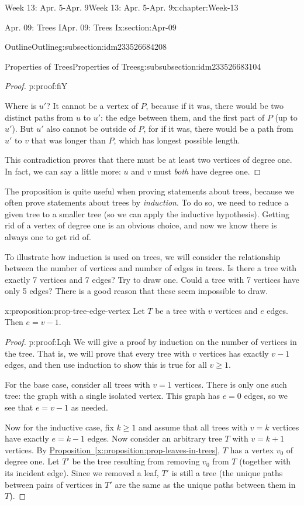 \documentclass[oneside,10pt,]{book}
\newcommand{\xreffont}{\relax}
\numberwithin{equation}{section}
\renewcommand{\ge}{\geqslant}
\begin{document}
\begin{chapterptx}{Week 13: Apr. 5-Apr. 9}{}{Week 13: Apr. 5-Apr. 9}{}{}{x:chapter:Week-13}
\begin{sectionptx}{Apr. 09: Trees I}{}{Apr. 09: Trees I}{}{}{x:section:Apr-09}
\begin{subsectionptx}{Outline}{}{Outline}{}{}{g:subsection:idm233526684208}
\begin{subsubsectionptx}{Properties of Trees}{}{Properties of Trees}{}{}{g:subsubsection:idm233526683104}
\begin{proof}{}{p:proof:fiY}
\par
Where is \(u'\)?  It cannot be a vertex of \(P\), because if it was, there would be two distinct paths from \(u\) to \(u'\): the edge between them, and the first part of \(P\) (up to \(u'\)).  But \(u'\) also cannot be outside of \(P\), for if it was, there would be a path from \(u'\) to \(v\) that was longer than \(P\), which has longest possible length.%
\par
This contradiction proves that there must be at least two vertices of degree one.  In fact, we can say a little more: \(u\) and \(v\) must \emph{both} have degree one.%
\end{proof}
The proposition is quite useful when proving statements about trees, because we often prove statements about trees by \emph{induction}.  To do so, we need to reduce a given tree to a smaller tree (so we can apply the inductive hypothesis).  Getting rid of a vertex of degree one is an obvious choice, and now we know there is always one to get rid of.%
\par
To illustrate how induction is used on trees, we will consider the relationship between the number of vertices and number of edges in trees.  Is there a tree with exactly 7 vertices and 7 edges?  Try to draw one.  Could a tree with 7 vertices have only 5 edges?  There is a good reason that these seem impossible to draw.%
\begin{proposition}{}{}{x:proposition:prop-tree-edge-vertex}%
%
Let \(T\) be a tree with \(v\) vertices and \(e\) edges.  Then \(e = v-1\).%
\end{proposition}
\begin{proof}{}{p:proof:Lqh}
We will give a proof by induction on the number of vertices in the tree.  That is, we will prove that every tree with \(v\) vertices has exactly \(v-1\) edges, and then use induction to show this is true for all \(v \ge 1\).%
\par
For the base case, consider all trees with \(v = 1\) vertices.  There is only one such tree: the graph with a single isolated vertex.  This graph has \(e = 0\) edges, so we see that \(e = v-1\) as needed.%
\par
Now for the inductive case, fix \(k \ge 1\) and assume that all trees with \(v=k\) vertices have exactly \(e=k-1\) edges.  Now consider an arbitrary tree \(T\) with \(v = k+1\) vertices.  By \hyperref[x:proposition:prop-leaves-in-trees]{Proposition~{\xreffont\ref{x:proposition:prop-leaves-in-trees}}}, \(T\) has a vertex \(v_0\) of degree one.  Let \(T'\) be the tree resulting from removing \(v_0\) from \(T\) (together with its incident edge).  Since we removed a leaf, \(T'\) is still a tree (the unique paths between pairs of vertices in \(T'\) are the same as the unique paths between them in \(T\)).%

\end{proof}
\end{subsubsectionptx}
\end{subsectionptx}
\end{sectionptx}
\end{chapterptx}
\end{document}
